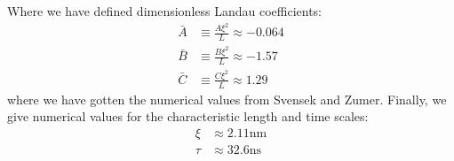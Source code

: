 \documentclass[reqno]{article}
\begin{document}
	Where we have defined dimensionless Landau coefficients:
	\begin{equation}\label{eq:ABC}
	\begin{split}
		\bar{A} &\equiv \frac{A \xi^2}{L} \approx -0.064 \\
		\bar{B} &\equiv \frac{B \xi^2}{L} \approx -1.57 \\
		\bar{C} &\equiv \frac{C \xi^2}{L} \approx 1.29
	\end{split}
	\end{equation}
	where we have gotten the numerical values from Svensek and Zumer. Finally, we give numerical values for the characteristic length and time scales:
	\begin{align}
		\xi &\approx 2.11\text{nm} \\
		\tau &\approx 32.6\text{ns}
	\end{align}
	
\end{document}

